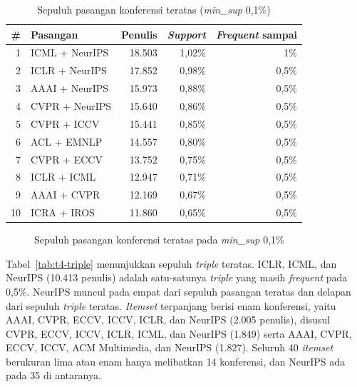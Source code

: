 \begin{table}[ht]
\caption{Sepuluh pasangan konferensi teratas (\textit{min\_sup} 0,1\%)}
\label{tab:t4-pasangan}
\small
\begin{tabular}{@{}rlrrr@{}}
\toprule
\textbf{\#} & \textbf{Pasangan} & \textbf{Penulis} & \textbf{\textit{Support}} & \textbf{\textit{Frequent} sampai} \\
\midrule
1 & ICML + NeurIPS & 18.503 & 1,02\% & 1\% \\
2 & ICLR + NeurIPS & 17.852 & 0,98\% & 0,5\% \\
3 & AAAI + NeurIPS & 15.973 & 0,88\% & 0,5\% \\
4 & CVPR + NeurIPS & 15.640 & 0,86\% & 0,5\% \\
5 & CVPR + ICCV & 15.441 & 0,85\% & 0,5\% \\
6 & ACL + EMNLP & 14.557 & 0,80\% & 0,5\% \\
7 & CVPR + ECCV & 13.752 & 0,75\% & 0,5\% \\
8 & ICLR + ICML & 12.947 & 0,71\% & 0,5\% \\
9 & AAAI + CVPR & 12.169 & 0,67\% & 0,5\% \\
10 & ICRA + IROS & 11.860 & 0,65\% & 0,5\% \\
\bottomrule
\end{tabular}
\end{table}

\begin{figure}[ht]
\centering
{}
\caption{Sepuluh pasangan konferensi teratas pada \textit{min\_sup} 0,1\%}
\label{fig:t4-pasangan}
\end{figure}

Tabel~\ref{tab:t4-triple} menunjukkan sepuluh \textit{triple} teratas. ICLR, ICML, dan NeurIPS (10.413 penulis) adalah satu-satunya \textit{triple} yang masih \textit{frequent} pada 0,5\%. NeurIPS muncul pada empat dari sepuluh pasangan teratas dan delapan dari sepuluh \textit{triple} teratas. \textit{Itemset} terpanjang berisi enam konferensi, yaitu AAAI, CVPR, ECCV, ICCV, ICLR, dan NeurIPS (2.005 penulis), disusul CVPR, ECCV, ICCV, ICLR, ICML, dan NeurIPS (1.849) serta AAAI, CVPR, ECCV, ICCV, ACM Multimedia, dan NeurIPS (1.827). Seluruh 40 \textit{itemset} berukuran lima atau enam hanya melibatkan 14 konferensi, dan NeurIPS ada pada 35 di antaranya.

